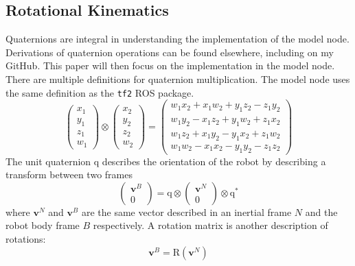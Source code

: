 \documentclass[lettersize,journal]{IEEEtran}
\begin{document}
\subsection{Rotational Kinematics}
Quaternions are integral in understanding the implementation of the model node.
Derivations of quaternion operations can be found elsewhere, including on my GitHub.
This paper will then focus on the implementation in the model node.
There are multiple definitions for quaternion multiplication.
The model node uses the same definition as the \texttt{tf2} ROS package.
\begin{equation}
  \begin{pmatrix}
    x_1 \\
    y_1 \\
    z_1 \\
    w_1
  \end{pmatrix} \otimes
  \begin{pmatrix}
    x_2 \\
    y_2 \\
    z_2 \\
    w_2
  \end{pmatrix} =
  \begin{pmatrix}
    w_1x_2 + x_1w_2 + y_1z_2 - z_1y_2 \\
    w_1y_2 - x_1z_2 + y_1w_2 + z_1x_2 \\
    w_1z_2 + x_1y_2 - y_1x_2 + z_1w_2 \\
    w_1w_2 - x_1x_2 - y_1y_2 - z_1z_2
  \end{pmatrix}
\end{equation}
The unit quaternion $\mathrm{q}$ describes the orientation of the robot by describing a transform between two frames
\begin{equation}
  \begin{pmatrix}
    
    \mathbf{v}^B \\
    0
  \end{pmatrix}
  = \mathrm{q} \otimes
  \begin{pmatrix}
    \mathbf{v}^N \\
    0
  \end{pmatrix}\otimes
  \mathrm{q}^*
\end{equation}
where $\mathbf{v}^N$ and $\mathbf{v}^B$ are the same vector described in an inertial frame $N$ and the robot body frame $B$ respectively.
A rotation matrix is another description of rotations:
\begin{equation}
  \mathbf{v}^B = \mathrm{R}\left(\mathbf{v}^N\right)
\end{equation}
\end{document}
